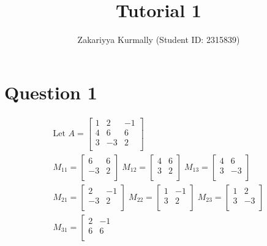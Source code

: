 \documentclass[12pt, a4paper]{article}
\title{Tutorial 1}
\author{Zakariyya Kurmally (Student ID: 2315839)}
\begin{document}
\maketitle

\section{Question 1}
\begin{gather*}
  \text{Let } A =
  \left[ \begin{array}{ccc}
    1 & 2 & -1\\
    4 & 6 & 6\\
    3 & -3 & 2\\
  \end{array} \right] \\[5pt]
  M_{11} = 
  \left[ \begin{array}{cc}
    6 & 6 \\
    -3 & 2 \\
  \end{array} \right] \; 
  M_{12} = 
  \left[ \begin{array}{cc}
    4 & 6 \\
    3 & 2 \\
  \end{array} \right] \; 
  M_{13} = 
  \left[ \begin{array}{cc}
    4 & 6 \\
    3 & -3 \\
  \end{array} \right] \\[5pt]
  M_{21} = 
  \left[ \begin{array}{cc}
    2 & -1 \\
    -3 & 2 \\
  \end{array} \right] \; 
  M_{22} = 
  \left[ \begin{array}{cc}
    1 & -1 \\
    3 & 2 \\
  \end{array} \right] \; 
  M_{23} = 
  \left[ \begin{array}{cc}
    1 & 2 \\
    3 & -3 \\
  \end{array} \right] \\[5pt]
  M_{31} = 
  \left[ \begin{array}{cc}
    2 & -1 \\
    6 & 6 \\

\end{array}
\end{gather*}
\end{document}
